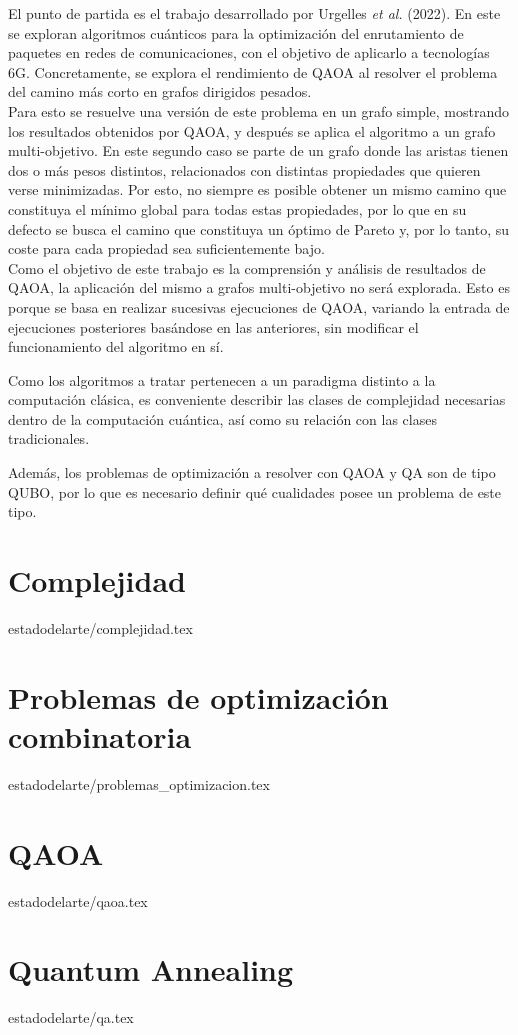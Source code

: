 El punto de partida es el trabajo desarrollado por Urgelles \textit{et al.} (2022)\cite{multi-objective_routing_optimization}.
En este se exploran algoritmos cuánticos para la optimización del enrutamiento de paquetes en redes de comunicaciones, con el objetivo de aplicarlo a tecnologías 6G.
Concretamente, se explora el rendimiento de QAOA al resolver el problema del camino más corto en grafos dirigidos pesados.
\\
Para esto se resuelve una versión de este problema en un grafo simple, mostrando los resultados obtenidos por QAOA, y después se aplica el algoritmo a un grafo multi-objetivo.
En este segundo caso se parte de un grafo donde las aristas tienen dos o más pesos distintos, relacionados con distintas propiedades que quieren verse minimizadas.
Por esto, no siempre es posible obtener un mismo camino que constituya el mínimo global para todas estas propiedades, por lo que en su defecto se busca el camino que constituya un óptimo de Pareto y, por lo tanto, su coste para cada propiedad sea suficientemente bajo.
\\
Como el objetivo de este trabajo es la comprensión y análisis de resultados de QAOA, la aplicación del mismo a grafos multi-objetivo no será explorada.
Esto es porque se basa en realizar sucesivas ejecuciones de QAOA, variando la entrada de ejecuciones posteriores basándose en las anteriores, sin modificar el funcionamiento del algoritmo en sí.

Como los algoritmos a tratar pertenecen a un paradigma distinto a la computación clásica, es conveniente describir las clases de complejidad necesarias dentro de la computación cuántica, así como su relación con las clases tradicionales.

Además, los problemas de optimización a resolver con QAOA y QA son de tipo QUBO, por lo que es necesario definir qué cualidades posee un problema de este tipo.

\section{Complejidad}{estadodelarte/complejidad.tex}

\section{Problemas de optimización combinatoria\label{sec:2-problemas de optimizacion combinatoria}}{estadodelarte/problemas_optimizacion.tex}

\section{QAOA\label{sec:2-qaoa}}{estadodelarte/qaoa.tex}

\section{Quantum Annealing}{estadodelarte/qa.tex}

